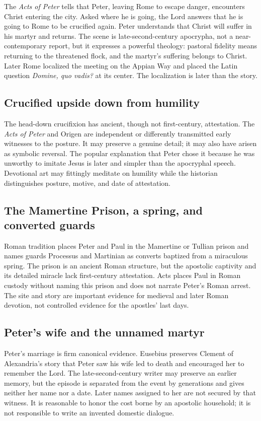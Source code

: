 The \emph{Acts of Peter} tells that Peter, leaving Rome to escape danger,
encounters Christ entering the city. Asked where he is going, the Lord answers
that he is going to Rome to be crucified again. Peter understands that Christ
will suffer in his martyr and returns. The scene is late-second-century
apocrypha, not a near-contemporary report, but it expresses a powerful
theology: pastoral fidelity means returning to the threatened flock, and the
martyr's suffering belongs to Christ. Later Rome localized the meeting on the
Appian Way and placed the Latin question \emph{Domine, quo vadis?} at its
center. The localization is later than the story.

\subsection{Crucified upside down from humility}

The head-down crucifixion has ancient, though not first-century, attestation.
The \emph{Acts of Peter} and Origen are independent or differently transmitted
early witnesses to the posture. It may preserve a genuine detail; it may also
have arisen as symbolic reversal. The popular explanation that Peter chose it
because he was unworthy to imitate Jesus is later and simpler than the
apocryphal speech. Devotional art may fittingly meditate on humility while the
historian distinguishes posture, motive, and date of attestation.

\subsection{The Mamertine Prison, a spring, and converted guards}

Roman tradition places Peter and Paul in the Mamertine or Tullian prison and
names guards Processus and Martinian as converts baptized from a miraculous
spring. The prison is an ancient Roman structure, but the apostolic captivity
and its detailed miracle lack first-century attestation. Acts places Paul in
Roman custody without naming this prison and does not narrate Peter's Roman
arrest. The site and story are important evidence for medieval and later
Roman devotion, not controlled evidence for the apostles' last days.

\subsection{Peter's wife and the unnamed martyr}

Peter's marriage is firm canonical evidence. Eusebius preserves Clement of
Alexandria's story that Peter saw his wife led to death and encouraged her to
remember the Lord. The late-second-century writer may preserve an earlier
memory, but the episode is separated from the event by generations and gives
neither her name nor a date. Later names assigned to her are not secured by
that witness. It is reasonable to honor the cost borne by an apostolic
household; it is not responsible to write an invented domestic dialogue.

